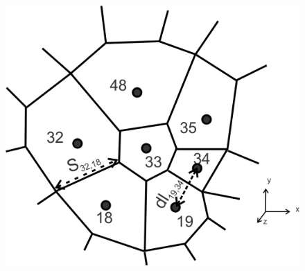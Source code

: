 \documentclass{article}
\begin{document}
\begin{figure}[H]
  \includegraphics[scale=0.6]{unstructured_mesh2.png}
  \label{fig:grid}
\end{figure}

\newpage
\end{document}
